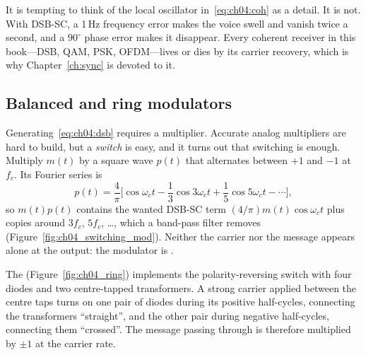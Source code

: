 \begin{pitfall}
It is tempting to think of the local oscillator in~\eqref{eq:ch04:coh} as a detail. It is not. With
DSB-SC, a 1\,Hz frequency error makes the voice swell and vanish twice a second, and a $90^\circ$ phase
error makes it disappear. Every coherent receiver in this book---DSB, QAM, PSK, OFDM---lives or dies by
its carrier recovery, which is why Chapter~\ref{ch:sync} is devoted to it.
\end{pitfall}

\subsection{Balanced and ring modulators}
\label{sec:ch04:ring}

Generating~\eqref{eq:ch04:dsb} requires a multiplier. Accurate analog multipliers are hard to build, but a
\emph{switch} is easy, and it turns out that switching is enough. Multiply $m(t)$ by a square wave $p(t)$
that alternates between $+1$ and $-1$ at $f_c$. Its Fourier series is
\begin{equation}
p(t)=\frac{4}{\pi}\Big[\cos\omega_ct-\frac13\cos3\omega_ct+\frac15\cos5\omega_ct-\cdots\Big],
\end{equation}
so $m(t)p(t)$ contains the wanted DSB-SC term $(4/\pi)m(t)\cos\omega_ct$ plus copies around $3f_c$,
$5f_c$, \dots, which a band-pass filter removes (Figure~\ref{fig:ch04_switching_mod}). Neither the
carrier nor the message appears alone at the output: the modulator is .


The  (Figure~\ref{fig:ch04_ring}) implements the polarity-reversing switch with four
diodes and two centre-tapped transformers. A strong carrier applied between the centre taps turns on one
pair of diodes during its positive half-cycles, connecting the transformers ``straight'', and the other
pair during negative half-cycles, connecting them ``crossed''. The message passing through is therefore
multiplied by $\pm1$ at the carrier rate.

